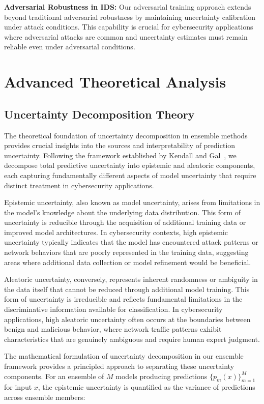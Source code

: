 \documentclass[journal]{IEEEtran}
\begin{document}
\textbf{Adversarial Robustness in IDS:} Our adversarial training approach extends beyond traditional adversarial robustness by maintaining uncertainty calibration under attack conditions. This capability is crucial for cybersecurity applications where adversarial attacks are common and uncertainty estimates must remain reliable even under adversarial conditions.

\section{Advanced Theoretical Analysis}

\subsection{Uncertainty Decomposition Theory}

The theoretical foundation of uncertainty decomposition in ensemble methods provides crucial insights into the sources and interpretability of prediction uncertainty. Following the framework established by Kendall and Gal~\cite{kendall2017uncertainties}, we decompose total predictive uncertainty into epistemic and aleatoric components, each capturing fundamentally different aspects of model uncertainty that require distinct treatment in cybersecurity applications.

Epistemic uncertainty, also known as model uncertainty, arises from limitations in the model's knowledge about the underlying data distribution. This form of uncertainty is reducible through the acquisition of additional training data or improved model architectures. In cybersecurity contexts, high epistemic uncertainty typically indicates that the model has encountered attack patterns or network behaviors that are poorly represented in the training data, suggesting areas where additional data collection or model refinement would be beneficial.

Aleatoric uncertainty, conversely, represents inherent randomness or ambiguity in the data itself that cannot be reduced through additional model training. This form of uncertainty is irreducible and reflects fundamental limitations in the discriminative information available for classification. In cybersecurity applications, high aleatoric uncertainty often occurs at the boundaries between benign and malicious behavior, where network traffic patterns exhibit characteristics that are genuinely ambiguous and require human expert judgment.

The mathematical formulation of uncertainty decomposition in our ensemble framework provides a principled approach to separating these uncertainty components. For an ensemble of $M$ models producing predictions $\{p_m(x)\}_{m=1}^M$ for input $x$, the epistemic uncertainty is quantified as the variance of predictions across ensemble members:
\end{document}
